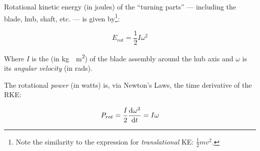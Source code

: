 \documentclass[11pt]{article}
\begin{document}
Rotational kinetic energy (in joules) of the ``turning parts'' ---
including the blade, hub, shaft, etc. --- is given by\footnote{Note
  the similarity to the expression for \emph{translational} KE:
  $\frac{1}{2}mv^2$.}:

\begin{equation}
\label{eqn:rke}
E_{rot} = \frac{1}{2}I\omega^2
\end{equation}

Where $I$ is the  (in \unit{kg\cdot m^2}) of
the blade assembly around the hub axis and $\omega$ is its
\emph{angular velocity} (in \unit{rad}{s}). 

The rotational \emph{power} (in watts) is, via Newton's Laws, the time
derivative of the RKE:

\begin{equation}
\label{eqn:rpow}
P_{rot} = \frac{I}{2}\deedee{\omega^2}{t} = I\omega
\end{equation}


\clearpage
\appendix


\end{document}
